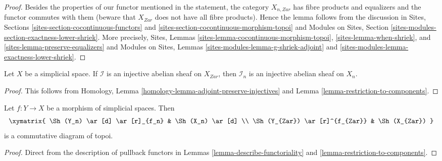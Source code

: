 \begin{proof}
Besides the properties of our functor mentioned in the statement,
the category $X_{n, Zar}$ has fibre products and equalizers
and the functor commutes with them (beware that $X_{Zar}$ does not
have all fibre products). Hence the lemma follows from the discussion in
Sites, Sections \ref{sites-section-cocontinuous-functors} and
\ref{sites-section-cocontinuous-morphism-topoi}
and
Modules on Sites, Section \ref{sites-modules-section-exactness-lower-shriek}.
More precisely,
Sites, Lemmas \ref{sites-lemma-cocontinuous-morphism-topoi},
\ref{sites-lemma-when-shriek}, and
\ref{sites-lemma-preserve-equalizers}
and
Modules on Sites, Lemmas
\ref{sites-modules-lemma-g-shriek-adjoint} and
\ref{sites-modules-lemma-exactness-lower-shriek}.
\end{proof}

\begin{lemma}
\label{lemma-restriction-injective-to-component}
Let $X$ be a simplicial space. If $\mathcal{I}$ is an injective abelian
sheaf on $X_{Zar}$, then $\mathcal{I}_n$ is an injective abelian sheaf
on $X_n$.
\end{lemma}

\begin{proof}
This follows from
Homology, Lemma \ref{homology-lemma-adjoint-preserve-injectives}
and
Lemma \ref{lemma-restriction-to-components}.
\end{proof}

\begin{lemma}
\label{lemma-restriction-to-components-functorial}
Let $f : Y \to X$ be a morphism of simplicial spaces. Then
$$
\xymatrix{
\Sh(Y_n) \ar[d] \ar[r]_{f_n} & \Sh(X_n) \ar[d] \\
\Sh(Y_{Zar}) \ar[r]^{f_{Zar}} & \Sh(X_{Zar})
}
$$
is a commutative diagram of topoi.
\end{lemma}

\begin{proof}
Direct from the description of pullback functors in
Lemmas \ref{lemma-describe-functoriality} and
\ref{lemma-restriction-to-components}.
\end{proof}

